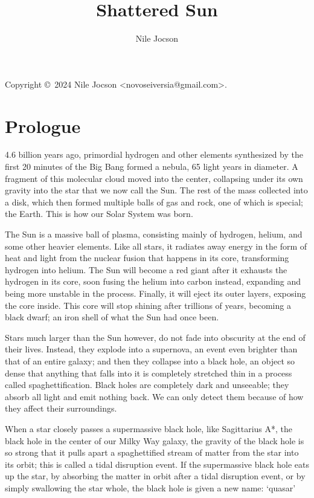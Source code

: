 \documentclass{book}
\title{Shattered Sun}
\author{Nile Jocson}
\begin{document}
	\frontmatter{}
		\maketitle{}

		Copyright \copyright{}~2024 Nile Jocson \textless{}novoseiversia@gmail.com\textgreater{}.



	\mainmatter{}
		\chapter*{Prologue}
			4.6 billion years ago, primordial hydrogen and other elements synthesized by the first
			20 minutes of the Big Bang formed a nebula, 65 light years in diameter. A fragment of
			this molecular cloud moved into the center, collapsing under its own gravity into the
			star that we now call the Sun. The rest of the mass collected into a disk, which then
			formed multiple balls of gas and rock, one of which is special; the Earth. This is how
			our Solar System was born.

			The Sun is a massive ball of plasma, consisting mainly of hydrogen, helium, and some
			other heavier elements. Like all stars, it radiates away energy in the form of heat and
			light from the nuclear fusion that happens in its core, transforming hydrogen into
			helium. The Sun will become a red giant after it exhausts the hydrogen in its core,
			soon fusing the helium into carbon instead, expanding and being more unstable in the
			process. Finally, it will eject its outer layers, exposing the core inside. This core
			will stop shining after trillions of years, becoming a black dwarf; an iron shell of
			what the Sun had once been.

			Stars much larger than the Sun however, do not fade into obscurity at the end of their
			lives. Instead, they explode into a supernova, an event even brighter than that of an
			entire galaxy; and then they collapse into a black hole, an object so dense that
			anything that falls into it is completely stretched thin in a process called
			spaghettification. Black holes are completely dark and unseeable; they absorb all light
			and emit nothing back. We can only detect them because of how they affect their
			surroundings.

			When a star closely passes a supermassive black hole, like Sagittarius A*, the black
			hole in the center of our Milky Way galaxy, the gravity of the black hole is so strong
			that it pulls apart a spaghettified stream of matter from the star into its orbit; this
			is called a tidal disruption event. If the supermassive black hole eats up the star, by
			absorbing the matter in orbit after a tidal disruption event, or by simply swallowing
			the star whole, the black hole is given a new name: `quasar'
\end{document}
